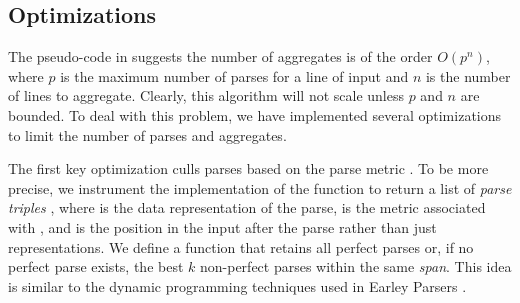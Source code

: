 
\subsection{Optimizations}\label{sec:opt}
The pseudo-code in  suggests the number of
aggregates is of the order $O(p ^ n)$, where $p$ is the maximum number of
parses for a line of input  and $n$ is the number of lines to
aggregate.  Clearly, this algorithm will not scale 
unless $p$ and $n$ are bounded.  To deal with this problem,
we have implemented several optimizations to limit the number of 
parses and aggregates. 

The first key optimization culls parses based on 
the parse metric . 
To be more precise, we instrument the implementation of the  function 
to return a list of 
{\em parse triples} , where  is the data representation of
the parse,  is the metric associated with , and
 is the position in the input after the parse rather than just representations.
We define a  function that retains all perfect parses
or, if no perfect parse exists, the best $k$ non-perfect parses 
within the same {\em span}.
This idea is similar to the dynamic programming techniques used in 
Earley Parsers \cite{earley-parser}. 

